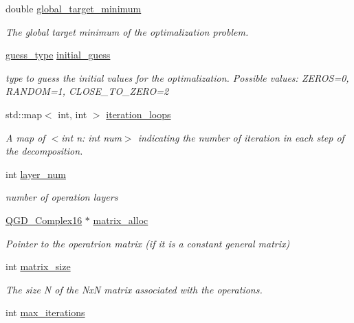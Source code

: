 \begin{DoxyCompactItemize}
double \hyperlink{class_decomposition___base_a6bc9e026221fab165ecc56f287d731a8}{global\+\_\+target\+\_\+minimum}
\begin{DoxyCompactList}\small\item\em The global target minimum of the optimalization problem. \end{DoxyCompactList}\item 
\hyperlink{decomposition_2include_2_decomposition___base_8h_a0e76cf2e4eb5edbf067ba5014ffa2134}{guess\+\_\+type} \hyperlink{class_decomposition___base_ad8df090247ebaea3ebb69e7737b194b9}{initial\+\_\+guess}
\begin{DoxyCompactList}\small\item\em type to guess the initial values for the optimalization. Possible values\+: Z\+E\+R\+OS=0, R\+A\+N\+D\+OM=1, C\+L\+O\+S\+E\+\_\+\+T\+O\+\_\+\+Z\+E\+RO=2 \end{DoxyCompactList}\item 
std\+::map$<$ int, int $>$ \hyperlink{class_decomposition___base_aa6f08845d47e18b6e6739b46d8fe35eb}{iteration\+\_\+loops}
\begin{DoxyCompactList}\small\item\em A map of $<$int n\+: int num$>$ indicating the number of iteration in each step of the decomposition. \end{DoxyCompactList}\item 
int \hyperlink{class_operation__block_a907101b9a80e6ebeaa96cc7b973cf413}{layer\+\_\+num}
\begin{DoxyCompactList}\small\item\em number of operation layers \end{DoxyCompactList}\item 
\hyperlink{struct_q_g_d___complex16}{Q\+G\+D\+\_\+\+Complex16} $\ast$ \hyperlink{class_operation_ade4d28d271ca13950d04363aac1c382e}{matrix\+\_\+alloc}
\begin{DoxyCompactList}\small\item\em Pointer to the operatrion matrix (if it is a constant general matrix) \end{DoxyCompactList}\item 
int \hyperlink{class_operation_a8236c07112cb165a00d3869363808624}{matrix\+\_\+size}
\begin{DoxyCompactList}\small\item\em The size N of the NxN matrix associated with the operations. \end{DoxyCompactList}\item 
int \hyperlink{class_decomposition___base_a89e74f075626c21e23228772bf8ad395}{max\+\_\+iterations}

\end{DoxyCompactItemize}
